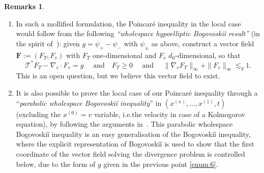 \documentclass[10pt]{amsart}
\providecommand{\ie}{i.e.}
\theoremstyle{definition}
\newtheorem{remarks}[theorem]{Remarks}
\newcommand{\cT}{{\mathcal T}}
\renewcommand{\vec}[1]{\boldsymbol{#1}}
\begin{document}
\begin{remarks}
\begin{enumerate}
\item\label{enum:6} In such a mollified formulation, the Poincaré inequality
in the local case would follow from the following
\textit{``wholespace hypoelliptic Bogovoskiǐ result''} (in the spirit
of~\cite{MR553920}): given $g=\psi_+-\psi_-$ with $\psi_\pm$
as above, construct a vector field $\vec{F}:= (F_T,F_{v})$
with $F_T$ one-dimensional and $F_{v}$ $d_0$-dimensional,
so that\vspace*{-3pt}
\begin{equation*}
\cT^* F_T - \nabla_{v} \cdot F_{v} = g \quad \text{ and
} \quad F_T \ge 0 \quad \text{ and } \quad \| \nabla_{v}
F_T \|_\infty + \| F_{v} \|_\infty \lesssim_g 1.
\end{equation*}
This is an open question, but we believe this vector field to
exist.

\item It is also possible to prove the local case of our
Poincaré inequality through a ``\emph{parabolic wholespace
Bogovoskiǐ inequality}'' in
$(x^{(\kappa)},\dots,x^{(1)}, t)$ (excluding the $x^{(0)}=v$
variable, \ie the velocity in case of a Kolmogorov
equation), by following the arguments
in~\cite{dietert2023quantitative}. This parabolic wholespace
Bogovoskiǐ inequality is an easy generalisation of the
Bogovoskiǐ inequality, where the explicit representation of
Bogovoskiǐ is used to show that the first coordinate of the
vector field solving the divergence problem is controlled
below, due to the form of $g$ given in the previous point \eqref{enum:6}.
\end{enumerate}
\end{remarks}
\end{document}

